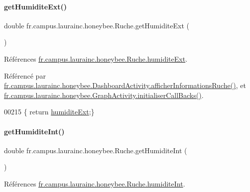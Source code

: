 \paragraph{\texorpdfstring{get\+Humidite\+Ext()}{getHumiditeExt()}}
{\footnotesize\ttfamily double fr.\+campus.\+laurainc.\+honeybee.\+Ruche.\+get\+Humidite\+Ext (\begin{DoxyParamCaption}{ }\end{DoxyParamCaption})}



Références \hyperlink{classfr_1_1campus_1_1laurainc_1_1honeybee_1_1_ruche_affacf72018828f470b5c69c1cc4f06a6}{fr.\+campus.\+laurainc.\+honeybee.\+Ruche.\+humidite\+Ext}.



Référencé par \hyperlink{classfr_1_1campus_1_1laurainc_1_1honeybee_1_1_dashboard_activity_a88f00531bee33bd6c47b33f5ac4df9ed}{fr.\+campus.\+laurainc.\+honeybee.\+Dashboard\+Activity.\+afficher\+Informations\+Ruche()}, et \hyperlink{classfr_1_1campus_1_1laurainc_1_1honeybee_1_1_graph_activity_a8dc56c3e0744bcb9295ad10e726b5fdb}{fr.\+campus.\+laurainc.\+honeybee.\+Graph\+Activity.\+initialiser\+Call\+Backs()}.


\begin{DoxyCode}
00215 \{ \textcolor{keywordflow}{return} \hyperlink{classfr_1_1campus_1_1laurainc_1_1honeybee_1_1_ruche_affacf72018828f470b5c69c1cc4f06a6}{humiditeExt};\}
\end{DoxyCode}
\mbox{\label{classfr_1_1campus_1_1laurainc_1_1honeybee_1_1_ruche_ab4f2b99dbdcb4cfcb81827f294ffeb4a}} 
\paragraph{\texorpdfstring{get\+Humidite\+Int()}{getHumiditeInt()}}
{\footnotesize\ttfamily double fr.\+campus.\+laurainc.\+honeybee.\+Ruche.\+get\+Humidite\+Int (\begin{DoxyParamCaption}{ }\end{DoxyParamCaption})}



Références \hyperlink{classfr_1_1campus_1_1laurainc_1_1honeybee_1_1_ruche_ad56a25b2e432592a20a5f7f4347f92f9}{fr.\+campus.\+laurainc.\+honeybee.\+Ruche.\+humidite\+Int}.



